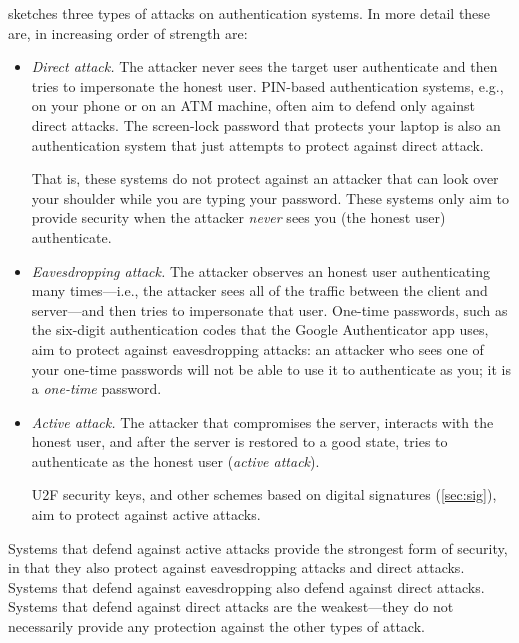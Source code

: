  sketches three types of attacks
on authentication systems. In more detail these
are, in increasing order of strength are:
\begin{itemize}
  \item \emph{Direct attack.} 
        The attacker never sees the target user authenticate and then tries
        to impersonate the honest user.
        PIN-based authentication systems, e.g., on your phone or on an ATM
        machine, often aim to defend only against direct attacks.
        The screen-lock password that protects your laptop is also an authentication system
        that just attempts to protect against direct attack.

        That is,
        these systems do not protect against an attacker that can look over your
        shoulder while you are typing your password. These systems only aim to provide
        security when the attacker \emph{never} sees you (the honest user) authenticate.


  \item \emph{Eavesdropping attack.} 
        The attacker observes an honest user authenticating many times---i.e.,
        the attacker sees all of the traffic between the client and server---and then
        tries to impersonate that user.
        One-time passwords, such as the six-digit authentication 
        codes that the Google Authenticator app uses, aim to protect against
        eavesdropping attacks: an attacker who sees one of your one-time passwords
        will not be able to use it to authenticate as you; it is a \emph{one-time} password.

  \item \emph{Active attack.} 
        The attacker that compromises the server, interacts with the honest user,
          and after the server is restored to a good state, tries to authenticate
        as the honest user (\emph{active attack}).

        U2F security keys, and other schemes based on digital
        signatures (\cref{sec:sig}), aim to protect against active attacks.

\end{itemize}
Systems that defend against active attacks provide the strongest
form of security, in that they also protect against eavesdropping attacks
and direct attacks.
Systems that defend against eavesdropping also defend against direct
attacks.
Systems that defend against direct attacks are the weakest---they do not necessarily
provide any protection against the other types of attack.




